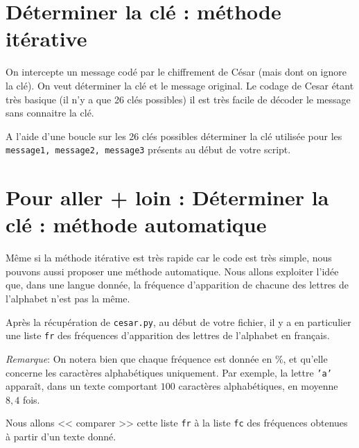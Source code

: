 \section*{Déterminer la clé : méthode itérative}
On intercepte un message codé par le chiffrement de César (mais dont on ignore la clé). On veut déterminer la clé et le message original. 
Le codage de Cesar étant très basique (il n'y a que 26 clés possibles) il est très facile de décoder le message sans connaitre la clé.\\

\begin{question}
A l'aide d'une boucle sur les 26 clés possibles déterminer la clé utilisée pour les \lstinline{message1, message2, message3} présents au début de votre script.
\end{question}


\section*{Pour aller + loin : Déterminer la clé : méthode automatique}

Même si la méthode itérative est très rapide car le code est très simple, nous pouvons aussi proposer une méthode automatique.
Nous allons exploiter l'idée que, dans une langue donnée, la fréquence d'apparition de chacune des lettres de l'alphabet n'est pas la même. 

Après la récupération de \lstinline{cesar.py}, au début de votre fichier, il y a en particulier une liste \lstinline{fr} des fréquences d'apparition %
des lettres de l'alphabet en français.

\emph{Remarque}: On notera bien que chaque fréquence est donnée en \%, et  qu'elle concerne les caractères alphabétiques uniquement. Par exemple, la lettre \texttt{'a'} apparaît, dans un texte comportant  $100$ caractères alphabétiques, en moyenne $8,4$ fois.

Nous allons << comparer >> cette liste \lstinline{fr} à la liste \lstinline{fc} des fréquences obtenues à partir d'un texte donné.


